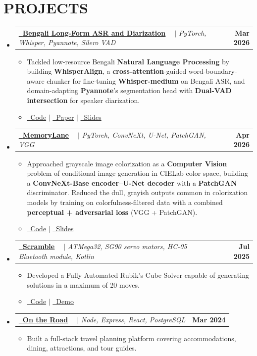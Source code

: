 \documentclass[letterpaper,11pt]{article}
\makeatletter
\newcommand{\resumeItem}[1]{
  \item\small{
    {#1 \vspace{-2pt}}
  }
}
\newcommand{\resumeProjectHeading}[2]{
    \item
    \begin{tabular*}{1.001\textwidth}{l@{\extracolsep{\fill}}r}
      \small#1 & \textbf{\small #2}\\
    \end{tabular*}\vspace{-4pt}
}
\newcommand{\resumeSubHeadingListStart}{\begin{itemize}[leftmargin=0.0in, label={}]}
\newcommand{\resumeSubHeadingListEnd}{\end{itemize}}
\newcommand{\resumeItemListStart}{\begin{itemize}}
\newcommand{\resumeItemListEnd}{\end{itemize}\vspace{-1pt}}
\makeatother
\begin{document}
\section{PROJECTS}
    \resumeSubHeadingListStart
        \resumeProjectHeading
          {\textbf{\href{https://github.com/Minamotooo/Luck-Is-All-You-Need-DL-Sprint-4.0}{\raisebox{-0.2\height}\faGithub\ \underline{Bengali Long-Form ASR and Diarization}} ~} $|$ \emph{PyTorch, Whisper, Pyannote, Silero VAD}}{Mar 2026}
          \resumeItemListStart
            \resumeItem{Tackled low-resource Bengali \textbf{Natural Language Processing} by building \textbf{WhisperAlign}, a \textbf{cross-attention}-guided word-boundary-aware chunker for fine-tuning \textbf{Whisper-medium} on Bengali ASR, and domain-adapting \textbf{Pyannote}'s segmentation head with \textbf{Dual-VAD intersection} for speaker diarization.}
            \resumeItem{\href{https://github.com/Minamotooo/Luck-Is-All-You-Need-DL-Sprint-4.0}{\faGithub\ Code} $|$ \href{https://arxiv.org/abs/2603.04809}{\faFilePdf\ Paper} $|$ \href{https://github.com/Minamotooo/Luck-Is-All-You-Need-DL-Sprint-4.0/blob/main/Presentation.pdf}{\faFilePowerpoint\ Slides}}
          \resumeItemListEnd\vspace{-8pt}
        \resumeProjectHeading
          {\textbf{\href{https://github.com/Minamotooo/MemoryLane}{\raisebox{-0.2\height}\faGithub\ \underline{MemoryLane}} ~} $|$ \emph{PyTorch, ConvNeXt, U-Net, PatchGAN, VGG}}{Apr 2026}
          \resumeItemListStart
            \resumeItem{Approached grayscale image colorization as a \textbf{Computer Vision} problem of conditional image generation in CIELab color space, building a \textbf{ConvNeXt-Base encoder–U-Net decoder} with a \textbf{PatchGAN} discriminator. Reduced the dull, grayish outputs common in colorization models by training on colorfulness-filtered data with a combined \textbf{perceptual + adversarial loss} (VGG + PatchGAN).}
            \resumeItem{\href{https://github.com/Minamotooo/MemoryLane}{\faGithub\ Code} $|$ \href{https://github.com/Minamotooo/MemoryLane/blob/main/MemoryLane.pdf}{\faFilePowerpoint\ Slides}}
          \resumeItemListEnd\vspace{-8pt}
        \resumeProjectHeading
          {\textbf{\href{https://github.com/Fanboyingeneral/SCRAMBLE/}{\raisebox{-0.2\height}\faGithub\ \underline{Scramble}} ~} $|$ \emph{ATMega32, SG90 servo motors, HC-05 Bluetooth module, Kotlin}}{Jul 2025}
          \resumeItemListStart
            \resumeItem{Developed a Fully Automated Rubik's Cube Solver capable of generating solutions in a maximum of 20 moves.}
            \resumeItem{\href{https://github.com/Fanboyingeneral/SCRAMBLE/}{\faGithub\ Code} $|$ \href{https://youtu.be/4RdSLmTVIiQ?si=WxHNnqUjH9Bf0_Kv}{\faYoutube\ Demo}}
          \resumeItemListEnd\vspace{-8pt}
        \resumeProjectHeading
          {\textbf{\href{https://github.com/Minamotooo/On-the-road}{\raisebox{-0.2\height}\faGithub\ \underline{On the Road}} ~} $|$ \emph{Node, Express, React, PostgreSQL}}{Mar 2024}
          \resumeItemListStart
            \resumeItem{Built a full-stack travel planning platform covering accommodations, dining, attractions, and tour guides.}
          \resumeItemListEnd
    \resumeSubHeadingListEnd
\end{document}
